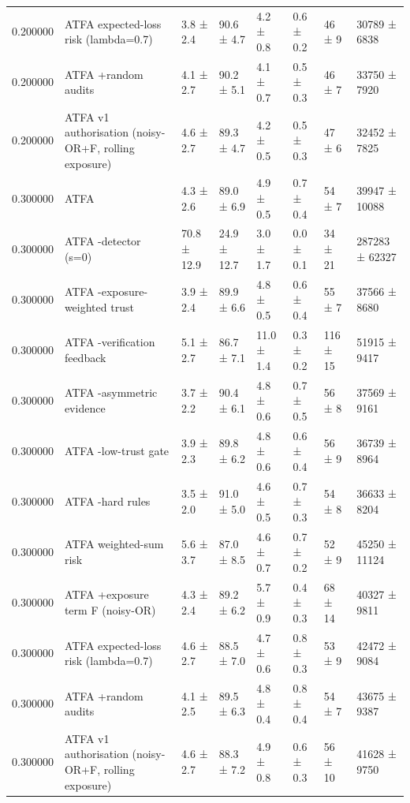 \begin{tabular}{rlllllll}
0.200000 & ATFA expected-loss risk (lambda=0.7) & 3.8 ± 2.4 & 90.6 ± 4.7 & 4.2 ± 0.8 & 0.6 ± 0.2 & 46 ± 9 & 30789 ± 6838 \\
0.200000 & ATFA +random audits & 4.1 ± 2.7 & 90.2 ± 5.1 & 4.1 ± 0.7 & 0.5 ± 0.3 & 46 ± 7 & 33750 ± 7920 \\
0.200000 & ATFA v1 authorisation (noisy-OR+F, rolling exposure) & 4.6 ± 2.7 & 89.3 ± 4.7 & 4.2 ± 0.5 & 0.5 ± 0.3 & 47 ± 6 & 32452 ± 7825 \\
0.300000 & ATFA & 4.3 ± 2.6 & 89.0 ± 6.9 & 4.9 ± 0.5 & 0.7 ± 0.4 & 54 ± 7 & 39947 ± 10088 \\
0.300000 & ATFA -detector (s=0) & 70.8 ± 12.9 & 24.9 ± 12.7 & 3.0 ± 1.7 & 0.0 ± 0.1 & 34 ± 21 & 287283 ± 62327 \\
0.300000 & ATFA -exposure-weighted trust & 3.9 ± 2.4 & 89.9 ± 6.6 & 4.8 ± 0.5 & 0.6 ± 0.4 & 55 ± 7 & 37566 ± 8680 \\
0.300000 & ATFA -verification feedback & 5.1 ± 2.7 & 86.7 ± 7.1 & 11.0 ± 1.4 & 0.3 ± 0.2 & 116 ± 15 & 51915 ± 9417 \\
0.300000 & ATFA -asymmetric evidence & 3.7 ± 2.2 & 90.4 ± 6.1 & 4.8 ± 0.6 & 0.7 ± 0.5 & 56 ± 8 & 37569 ± 9161 \\
0.300000 & ATFA -low-trust gate & 3.9 ± 2.3 & 89.8 ± 6.2 & 4.8 ± 0.6 & 0.6 ± 0.4 & 56 ± 9 & 36739 ± 8964 \\
0.300000 & ATFA -hard rules & 3.5 ± 2.0 & 91.0 ± 5.0 & 4.6 ± 0.5 & 0.7 ± 0.3 & 54 ± 8 & 36633 ± 8204 \\
0.300000 & ATFA weighted-sum risk & 5.6 ± 3.7 & 87.0 ± 8.5 & 4.6 ± 0.7 & 0.7 ± 0.2 & 52 ± 9 & 45250 ± 11124 \\
0.300000 & ATFA +exposure term F (noisy-OR) & 4.3 ± 2.4 & 89.2 ± 6.2 & 5.7 ± 0.9 & 0.4 ± 0.3 & 68 ± 14 & 40327 ± 9811 \\
0.300000 & ATFA expected-loss risk (lambda=0.7) & 4.6 ± 2.7 & 88.5 ± 7.0 & 4.7 ± 0.6 & 0.8 ± 0.3 & 53 ± 9 & 42472 ± 9084 \\
0.300000 & ATFA +random audits & 4.1 ± 2.5 & 89.5 ± 6.3 & 4.8 ± 0.4 & 0.8 ± 0.4 & 54 ± 7 & 43675 ± 9387 \\
0.300000 & ATFA v1 authorisation (noisy-OR+F, rolling exposure) & 4.6 ± 2.7 & 88.3 ± 7.2 & 4.9 ± 0.8 & 0.6 ± 0.3 & 56 ± 10 & 41628 ± 9750 \\
\bottomrule
\end{tabular}

